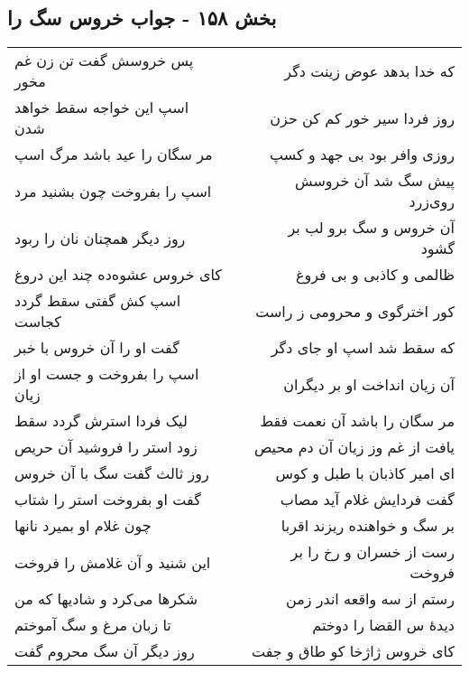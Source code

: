 \begin{center}
\section*{بخش ۱۵۸ - جواب خروس سگ را}
\label{sec:sh158}
\begin{longtable}{l p{0.5cm} r}
پس خروسش گفت تن زن غم مخور
&&
که خدا بدهد عوض زینت دگر
\\
اسپ این خواجه سقط خواهد شدن
&&
روز فردا سیر خور کم کن حزن
\\
مر سگان را عید باشد مرگ اسپ
&&
روزی وافر بود بی جهد و کسپ
\\
اسپ را بفروخت چون بشنید مرد
&&
پیش سگ شد آن خروسش روی‌زرد
\\
روز دیگر همچنان نان را ربود
&&
آن خروس و سگ برو لب بر گشود
\\
کای خروس عشوه‌ده چند این دروغ
&&
ظالمی و کاذبی و بی فروغ
\\
اسپ کش گفتی سقط گردد کجاست
&&
کور اخترگوی و محرومی ز راست
\\
گفت او را آن خروس با خبر
&&
که سقط شد اسپ او جای دگر
\\
اسپ را بفروخت و جست او از زیان
&&
آن زیان انداخت او بر دیگران
\\
لیک فردا استرش گردد سقط
&&
مر سگان را باشد آن نعمت فقط
\\
زود استر را فروشید آن حریص
&&
یافت از غم وز زیان آن دم محیص
\\
روز ثالث گفت سگ با آن خروس
&&
ای امیر کاذبان با طبل و کوس
\\
گفت او بفروخت استر را شتاب
&&
گفت فردایش غلام آید مصاب
\\
چون غلام او بمیرد نانها
&&
بر سگ و خواهنده ریزند اقربا
\\
این شنید و آن غلامش را فروخت
&&
رست از خسران و رخ را بر فروخت
\\
شکرها می‌کرد و شادیها که من
&&
رستم از سه واقعه اندر زمن
\\
تا زبان مرغ و سگ آموختم
&&
دیدهٔ س القضا را دوختم
\\
روز دیگر آن سگ محروم گفت
&&
کای خروس ژاژخا کو طاق و جفت
\\
\end{longtable}
\end{center}
